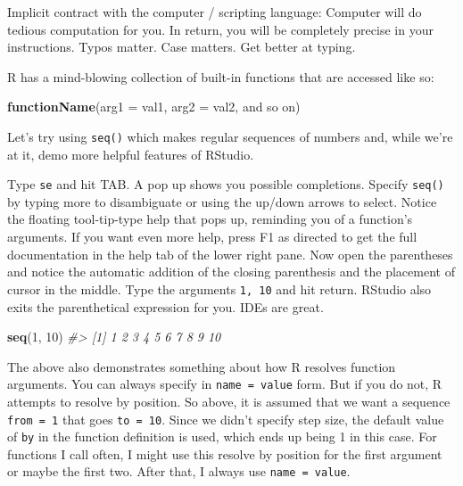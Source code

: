 \documentclass[
]{book}
\newenvironment{Shaded}{\begin{snugshade}}{\end{snugshade}}
\newcommand{\CommentTok}[1]{\textcolor[rgb]{0.56,0.35,0.01}{\textit{#1}}}
\newcommand{\DataTypeTok}[1]{\textcolor[rgb]{0.13,0.29,0.53}{#1}}
\newcommand{\DecValTok}[1]{\textcolor[rgb]{0.00,0.00,0.81}{#1}}
\newcommand{\KeywordTok}[1]{\textcolor[rgb]{0.13,0.29,0.53}{\textbf{#1}}}
\newcommand{\NormalTok}[1]{#1}
\begin{document}
Implicit contract with the computer / scripting language: Computer will do tedious computation for you. In return, you will be completely precise in your instructions. Typos matter. Case matters. Get better at typing.

R has a mind-blowing collection of built-in functions that are accessed like so:

\begin{Shaded}
\begin{Highlighting}[]
\KeywordTok{functionName}\NormalTok{(}\DataTypeTok{arg1 =}\NormalTok{ val1, }\DataTypeTok{arg2 =}\NormalTok{ val2, and so on)}
\end{Highlighting}
\end{Shaded}

Let's try using \texttt{seq()} which makes regular sequences of numbers and, while we're at it, demo more helpful features of RStudio.

Type \texttt{se} and hit TAB. A pop up shows you possible completions. Specify \texttt{seq()} by typing more to disambiguate or using the up/down arrows to select. Notice the floating tool-tip-type help that pops up, reminding you of a function's arguments. If you want even more help, press F1 as directed to get the full documentation in the help tab of the lower right pane. Now open the parentheses and notice the automatic addition of the closing parenthesis and the placement of cursor in the middle. Type the arguments \texttt{1,\ 10} and hit return. RStudio also exits the parenthetical expression for you. IDEs are great.

\begin{Shaded}
\begin{Highlighting}[]
\KeywordTok{seq}\NormalTok{(}\DecValTok{1}\NormalTok{, }\DecValTok{10}\NormalTok{)}
\CommentTok{#>  [1]  1  2  3  4  5  6  7  8  9 10}
\end{Highlighting}
\end{Shaded}

The above also demonstrates something about how R resolves function arguments. You can always specify in \texttt{name\ =\ value} form. But if you do not, R attempts to resolve by position. So above, it is assumed that we want a sequence \texttt{from\ =\ 1} that goes \texttt{to\ =\ 10}. Since we didn't specify step size, the default value of \texttt{by} in the function definition is used, which ends up being 1 in this case. For functions I call often, I might use this resolve by position for the first
argument or maybe the first two. After that, I always use \texttt{name\ =\ value}.
\end{document}

